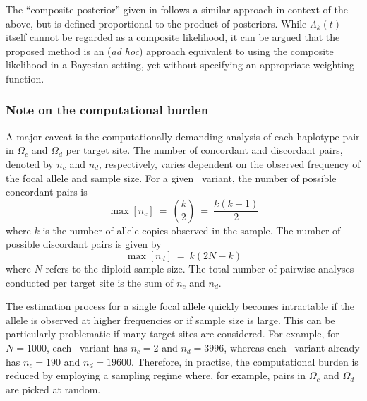 The ``composite posterior'' given in  follows a similar approach in context of the above, but is defined proportional to the product of posteriors.
While ${\Lambda_k(t)}$ itself cannot be regarded as a composite likelihood, it can be argued that the proposed method is an (\emph{ad hoc}) approach equivalent to using the composite likelihood in a Bayesian setting, yet without specifying an appropriate weighting function.



%
\subsubsection{Note on the computational burden}
%

A major caveat is the computationally demanding analysis of each haplotype pair in $\Omega_c$ and $\Omega_d$ per target site.
The number of concordant and discordant pairs, denoted by $n_c$ and $n_d$, respectively, varies dependent on the observed frequency of the focal allele and sample size.
For a given \fk{}~variant, the number of possible concordant pairs is
\begin{equation}\label{eq:age_nc}
	\max[n_c] ~=~ {{k}\choose{2}} ~=~ \frac{k(k-1)}{2}
\end{equation}
where $k$ is the number of allele copies observed in the sample.
The number of possible discordant pairs is given by
\begin{equation}\label{eq:age_nd}
	\max[n_d] ~=~ k(2N-k)
\end{equation}
where $N$ refers to the diploid sample size.
The total number of pairwise analyses conducted per target site is the sum of $n_c$ and $n_d$.

The estimation process for a single focal allele quickly becomes intractable if the allele is observed at higher frequencies or if sample size is large.
This can be particularly problematic if many target sites are considered.
For example, for ${N=\num{1000}}$, each ~variant has ${n_c=2}$ and ${n_d=\num{3996}}$, whereas each ~variant already has ${n_c=\num{190}}$ and ${n_d=\num{19600}}$.
Therefore, in practise, the computational burden is reduced by employing a sampling regime where, for example, pairs in $\Omega_c$ and $\Omega_d$ are picked at random.



